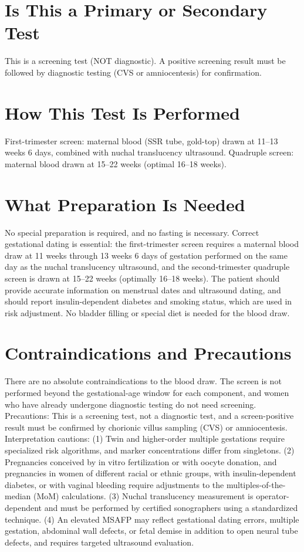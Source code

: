 \section*{Is This a Primary or Secondary Test}
This is a screening test (NOT diagnostic). A positive screening result must be followed by diagnostic testing (CVS or amniocentesis) for confirmation.

\section*{How This Test Is Performed}
First-trimester screen: maternal blood (SSR tube, gold-top) drawn at 11--13 weeks 6 days, combined with nuchal translucency ultrasound. Quadruple screen: maternal blood drawn at 15--22 weeks (optimal 16--18 weeks).

\section*{What Preparation Is Needed}
No special preparation is required, and no fasting is necessary. Correct gestational dating is essential: the first-trimester screen requires a maternal blood draw at 11 weeks through 13 weeks 6 days of gestation performed on the same day as the nuchal translucency ultrasound, and the second-trimester quadruple screen is drawn at 15--22 weeks (optimally 16--18 weeks). The patient should provide accurate information on menstrual dates and ultrasound dating, and should report insulin-dependent diabetes and smoking status, which are used in risk adjustment. No bladder filling or special diet is needed for the blood draw.

\section*{Contraindications and Precautions}
There are no absolute contraindications to the blood draw. The screen is not performed beyond the gestational-age window for each component, and women who have already undergone diagnostic testing do not need screening. Precautions: This is a screening test, not a diagnostic test, and a screen-positive result must be confirmed by chorionic villus sampling (CVS) or amniocentesis. Interpretation cautions: (1) Twin and higher-order multiple gestations require specialized risk algorithms, and marker concentrations differ from singletons. (2) Pregnancies conceived by in vitro fertilization or with oocyte donation, and pregnancies in women of different racial or ethnic groups, with insulin-dependent diabetes, or with vaginal bleeding require adjustments to the multiples-of-the-median (MoM) calculations. (3) Nuchal translucency measurement is operator-dependent and must be performed by certified sonographers using a standardized technique. (4) An elevated MSAFP may reflect gestational dating errors, multiple gestation, abdominal wall defects, or fetal demise in addition to open neural tube defects, and requires targeted ultrasound evaluation.

